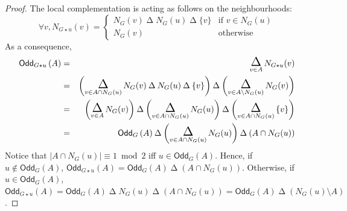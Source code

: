 \documentclass[a4paper,onecolumn,superscriptaddress,11pt,accepted=2020-04-27]{quantumarticle}
\newcommand{\symd}{\mathbin{\Delta}\xspace}
\newcommand{\Symdi}[1]{\underset{\scriptstyle #1}{\scalebox{1.5}{$\symd$}}\,}
\newcommand{\odd}[2]{\textsf{Odd}_{#1}\left(#2\right)}
\theoremstyle{definition}
\begin{document}
\begin{proof}
The local complementation is acting as follows on the neighbourhoods: %
$$\forall v, N_{G\star u} (v) = \begin{cases} N_G(v) \symd N_G(u)\symd \{v\} &\text{if $v\in N_G(u)$}\\ N_G(v) &\text{otherwise} \end{cases}$$
As a consequence,
\begin{eqnarray*}
  \odd {G\star u} A&=&\Symdi{v\in A} N_{G\star u} (v)\\
  &=& \left(\Symdi{v\in A\cap N_G(u)} N_{G} (v)\symd N_G(u)\symd \{v\}\right) \symd  \left(\Symdi{v\in A\setminus  N_G(u)} N_{G} (v)\right)\\
  &=&\left(\Symdi{v\in A} N_{G} (v)\right) \symd \left(\Symdi{v\in A\cap N_G(u)}  N_G(u) \right) \symd  \left(\Symdi{v\in A\cap N_G(u)}  \{v\}\right)\\
  &=&\odd G A \symd \left(\Symdi{v\in A\cap N_G(u)}  N_G(u) \right) \symd (A\cap N_G(u))
\end{eqnarray*}
Notice that $|A\cap N_G(u)| \equiv 1 \bmod 2$ iff $u\in \odd G A$. Hence, if $u\notin \odd G A$, 
$
   \odd {G\star u} A  =\odd G A  \symd (A\cap N_G(u))
$.  Otherwise, if $u \in \odd G A$, 
$    \odd {G\star u} A  =\odd G A \symd N_G(u)\symd (A\cap N_G(u)) =  \odd G A\symd (N_G(u)\setminus A)
$.%
%

\end{proof}
\end{document}
